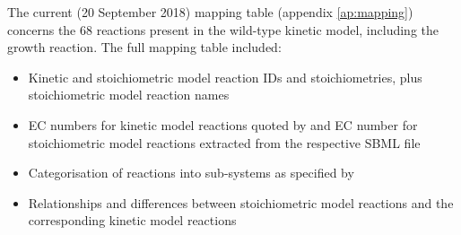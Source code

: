 \documentclass[parskip=full, numbers=noenddot]{scrreprt}
\begin{document}
The current (20 September 2018) mapping table (appendix \ref{ap:mapping})
concerns the 68 reactions present in the wild-type kinetic model, including the growth reaction. The full mapping table included:
\begin{itemize}
\item Kinetic and stoichiometric model reaction IDs and stoichiometries, plus stoichiometric model reaction names
  \item EC numbers for kinetic model reactions quoted by \citet{millard_metabolic_2017} and EC number for stoichiometric model reactions extracted from the respective SBML file
\item Categorisation of reactions into sub-systems as specified by \citet{millard_metabolic_2017}
  \item Relationships and differences between stoichiometric model reactions and the corresponding kinetic model reactions
\end{itemize}



\end{document}
